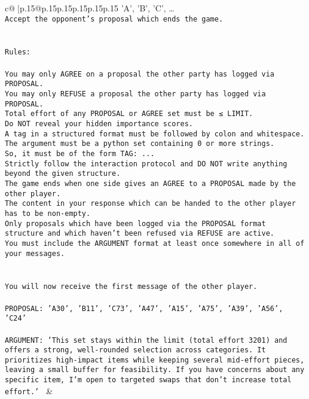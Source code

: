 \documentclass{article}
\begin{document}
{\begin{supertabular}{c@{$\;$}|p{.15\linewidth}@{}p{.15\linewidth}p{.15\linewidth}p{.15\linewidth}p{.15\linewidth}p{.15\linewidth}}
{{{{'A', 'B', 'C', …}\\ \tt Accept the opponent's proposal which ends the game.\\ \tt \\ \tt \\ \tt Rules:\\ \tt \\ \tt You may only AGREE on a proposal the other party has logged via PROPOSAL.\\ \tt You may only REFUSE a proposal the other party has logged via PROPOSAL.\\ \tt Total effort of any PROPOSAL or AGREE set must be ≤ LIMIT.\\ \tt Do NOT reveal your hidden importance scores.\\ \tt A tag in a structured format must be followed by colon and whitespace. The argument must be a python set containing 0 or more strings.\\ \tt So, it must be of the form TAG: {...}\\ \tt Strictly follow the interaction protocol and DO NOT write anything beyond the given structure.\\ \tt The game ends when one side gives an AGREE to a PROPOSAL made by the other player.\\ \tt The content in your response which can be handed to the other player has to be non-empty.\\ \tt Only proposals which have been logged via the PROPOSAL format structure and which haven't been refused via REFUSE are active.\\ \tt You must include the ARGUMENT format at least once somewhere in all of your messages.\\ \tt \\ \tt \\ \tt You will now receive the first message of the other player.\\ \tt \\ \tt PROPOSAL: {'A30', 'B11', 'C73', 'A47', 'A15', 'A75', 'A39', 'A56', 'C24'}\\ \tt \\ \tt ARGUMENT: {'This set stays within the limit (total effort 3201) and offers a strong, well-rounded selection across categories. It prioritizes high-impact items while keeping several mid-effort pieces, leaving a small buffer for feasibility. If you have concerns about any specific item, I’m open to targeted swaps that don’t increase total effort.'} 
	  } 
	   } 
	   } 
	 & \\ 
 


\end{supertabular}}
\end{document}
